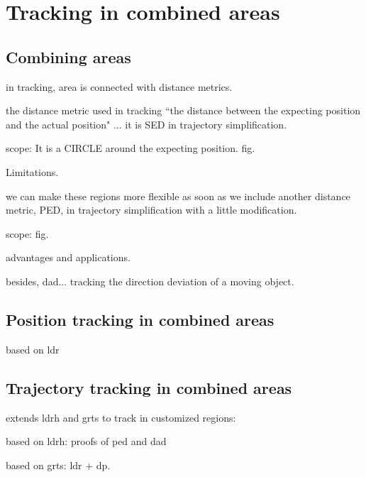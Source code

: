 

\section{Tracking in combined areas}
\label{sec:position}


\subsection{Combining areas}
in tracking, area is connected with distance metrics.

the distance metric used in tracking ``the distance between the expecting position and the actual position" ... it is SED in trajectory simplification. 

scope: It is  a CIRCLE around the expecting position. fig.

Limitations.

we can make these regions more flexible as soon as we include another distance metric, PED, in trajectory simplification with a little modification.

scope: fig.

advantages and applications.

besides, dad... tracking the direction deviation of a moving object.
 
\subsection{Position tracking in combined areas}
based on ldr


\subsection{Trajectory tracking in combined areas}
extends ldrh and grts to track in customized regions:

based on ldrh: proofs of ped and dad

based on grts: ldr + dp. 
